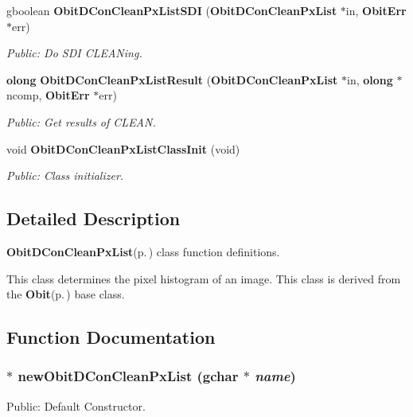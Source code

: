 \begin{CompactItemize}
gboolean {\bf Obit\-DCon\-Clean\-Px\-List\-SDI} ({\bf Obit\-DCon\-Clean\-Px\-List} $\ast$in, {\bf Obit\-Err} $\ast$err)
\begin{CompactList}\small\item\em Public: Do SDI CLEANing. \item\end{CompactList}\item 
{\bf olong} {\bf Obit\-DCon\-Clean\-Px\-List\-Result} ({\bf Obit\-DCon\-Clean\-Px\-List} $\ast$in, {\bf olong} $\ast$ncomp, {\bf Obit\-Err} $\ast$err)
\begin{CompactList}\small\item\em Public: Get results of CLEAN. \item\end{CompactList}\item 
void {\bf Obit\-DCon\-Clean\-Px\-List\-Class\-Init} (void)
\begin{CompactList}\small\item\em Public: Class initializer. \item\end{CompactList}\end{CompactItemize}


\subsection{Detailed Description}
{\bf Obit\-DCon\-Clean\-Px\-List}{\rm (p.\,\pageref{structObitDConCleanPxList})} class function definitions. 

This class determines the pixel histogram of an image. This class is derived from the {\bf Obit}{\rm (p.\,\pageref{structObit})} base class.

\subsection{Function Documentation}
\subsubsection{$\ast$ new\-Obit\-DCon\-Clean\-Px\-List (gchar $\ast$ {\em name})}\label{ObitDConCleanPxList_8c_a10}


Public: Default Constructor. 

